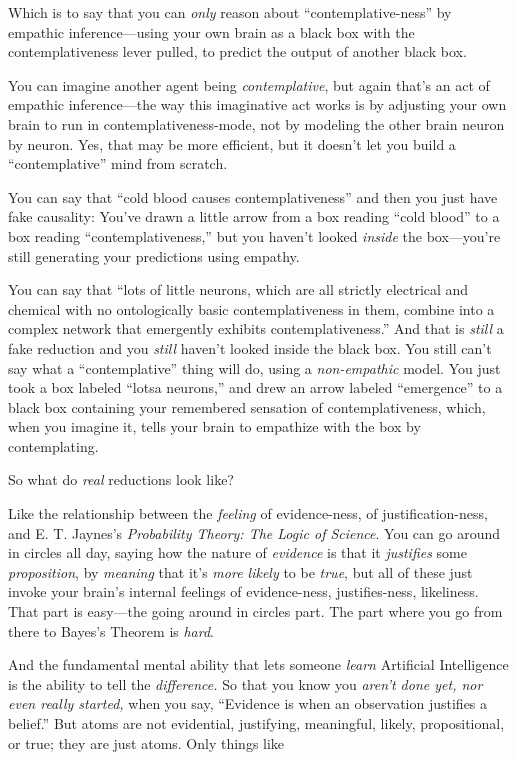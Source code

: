{
 Which is to say that you can \textit{only} reason about
``contemplative-ness'' by empathic
inference{}---using your own brain as a black box with the
contemplativeness lever pulled, to predict the output of another black
box.}

{
 You can imagine another agent being \textit{contemplative}, but
again that's an act of empathic inference---the way
this imaginative act works is by adjusting your own brain to run in
contemplativeness-mode, not by modeling the other brain neuron by
neuron. Yes, that may be more efficient, but it doesn't
let you build a ``contemplative''
mind from scratch.}

{
 You can say that ``cold blood causes
contemplativeness'' and then you just have fake
causality: You've drawn a little arrow from a box
reading ``cold blood'' to a box
reading ``contemplativeness,'' but
you haven't looked \textit{inside} the
box---you're still generating your predictions using
empathy.}

{
 You can say that ``lots of little neurons, which
are all strictly electrical and chemical with no ontologically basic
contemplativeness in them, combine into a complex network that
emergently exhibits contemplativeness.'' And that is
\textit{still} a fake reduction and you \textit{still}
haven't looked inside the black box. You still
can't say what a
``contemplative'' thing will do,
using a \textit{non-empathic} model. You just took a box labeled
``lotsa neurons,'' and drew an arrow
labeled ``emergence'' to a black box
containing your remembered sensation of contemplativeness, which, when
you imagine it, tells your brain to empathize with the box by
contemplating.}

{
 So what do \textit{real} reductions look like?}

{
 Like the relationship between the \textit{feeling} of
evidence-ness, of justification-ness, and E. T.
Jaynes's \textit{Probability Theory: The Logic of
Science}. You can go around in circles all day, saying how the nature
of \textit{evidence} is that it \textit{justifies} some
\textit{proposition}, by \textit{meaning} that it's
\textit{more likely} to be \textit{true}, but all of these just invoke
your brain's internal feelings of evidence-ness,
justifies-ness, likeliness. That part is easy---the going around in
circles part. The part where you go from there to
Bayes's Theorem is \textit{hard}.}

{
 And the fundamental mental ability that lets someone
\textit{learn} Artificial Intelligence is the ability to tell the
\textit{difference.} So that you know you
\textit{aren't done yet, nor even really started,} when
you say, ``Evidence is when an observation justifies a
belief.'' But atoms are not evidential, justifying,
meaningful, likely, propositional, or true; they are just atoms. Only
things like}

